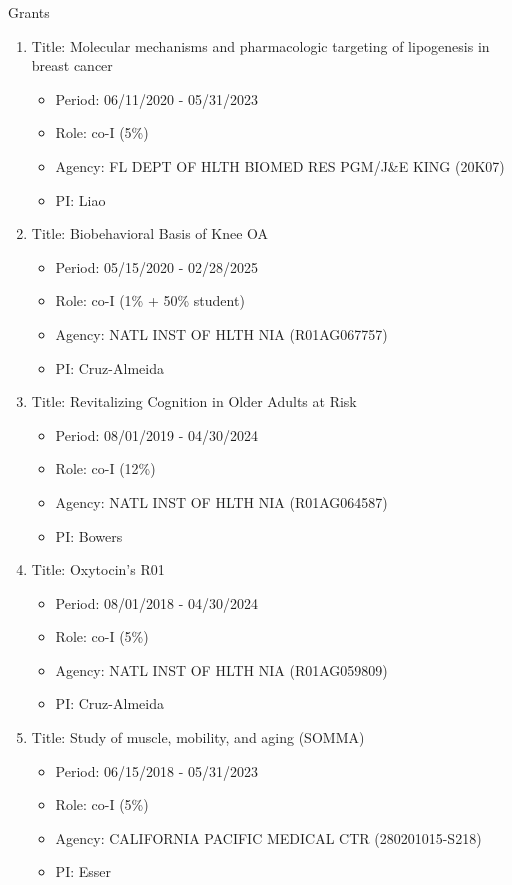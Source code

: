 \documentclass{resume} %
\begin{document}
\begin{rSection}{Grants}
\begin{enumerate}[noitemsep,topsep=0pt]
\item Title: Molecular mechanisms and pharmacologic targeting of lipogenesis in breast cancer
\begin{itemize}[noitemsep,topsep=0pt,leftmargin=*]
\item[] Period: 06/11/2020 - 05/31/2023
\item[] Role: co-I (5\%)
\item[] Agency: FL DEPT OF HLTH BIOMED RES PGM/J\&E KING (20K07)
\item[] PI: Liao
\end{itemize}

\item Title: Biobehavioral Basis of Knee OA
\begin{itemize}[noitemsep,topsep=0pt,leftmargin=*]
\item[] Period: 05/15/2020 - 02/28/2025
\item[] Role: co-I (1\% + 50\% student)
\item[] Agency: NATL INST OF HLTH NIA (R01AG067757)
\item[] PI: Cruz-Almeida
\end{itemize}

\item Title: Revitalizing Cognition in Older Adults at Risk
\begin{itemize}[noitemsep,topsep=0pt,leftmargin=*]
\item[] Period: 08/01/2019 - 04/30/2024
\item[] Role: co-I (12\%)
\item[] Agency: NATL INST OF HLTH NIA (R01AG064587)
\item[] PI: Bowers
\end{itemize}

\item Title: Oxytocin's R01
\begin{itemize}[noitemsep,topsep=0pt,leftmargin=*]
\item[] Period: 08/01/2018 - 04/30/2024
\item[] Role: co-I (5\%)
\item[] Agency: NATL INST OF HLTH NIA (R01AG059809)
\item[] PI: Cruz-Almeida
\end{itemize}

\item Title: Study of muscle, mobility, and aging (SOMMA)
\begin{itemize}[noitemsep,topsep=0pt,leftmargin=*]
\item[] Period: 06/15/2018 - 05/31/2023
\item[] Role: co-I (5\%)
\item[] Agency: CALIFORNIA PACIFIC MEDICAL CTR (280201015-S218)
\item[] PI: Esser
\end{itemize}


\end{enumerate}
\end{rSection}
\end{document}
